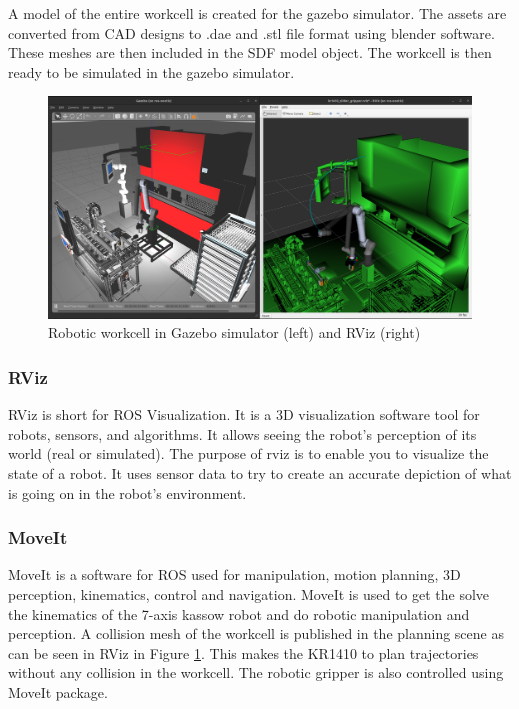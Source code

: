 A model of the entire workcell is created for the gazebo simulator. The assets are converted from CAD designs
to .dae and .stl file format using blender software. These meshes are then included in the SDF model object.
The workcell is then ready to be simulated in the gazebo simulator.

\begin{figure}[h]
    \centering
    \includegraphics[width=\textwidth]{figures/gazebo-rviz.png}
    \caption{Robotic workcell in Gazebo simulator (left) and RViz (right)}
    \label{fig:gazebo-rviz}
\end{figure}

\subsubsection{RViz}
\label{subsubsec:RViz}
RViz is short for ROS Visualization. It is a 3D visualization software tool for robots, sensors, and algorithms.
It allows seeing the robot's perception of its world (real or simulated).
The purpose of rviz is to enable you to visualize the state of a robot. It uses sensor data to try
to create an accurate depiction of what is going on in the robot's environment. \cite{rviz}

\subsubsection{MoveIt}
\label{subsubsec:moveit}
MoveIt is a software for ROS used for manipulation, motion planning, 3D perception, kinematics, control and navigation. \cite{moveit}
MoveIt is used to get the solve the kinematics of the 7-axis kassow robot and do robotic manipulation and perception.
A collision mesh of the workcell is published in the planning scene as can be seen in RViz in Figure \ref{fig:gazebo-rviz}.
This makes the KR1410 to plan trajectories without any collision in the workcell. The robotic gripper is also controlled using MoveIt package.
